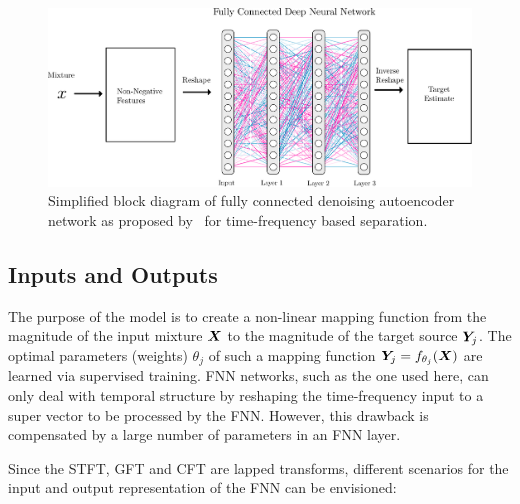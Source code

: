 \begin{figure}[ht!]
\centering
  \includegraphics[width=\textwidth]{Chapters/06_Separation_Unknown/figures/uhlich_dnn.pdf}
\caption{Simplified block diagram of fully connected denoising autoencoder network as proposed by~\cite{uhlich15} for time-frequency based separation.}
\label{fig:cft_dnn}
\end{figure}

\subsection{Inputs and Outputs}

The purpose of the model is to create a non-linear mapping function from the magnitude of the input mixture \({\bm{X}}\) to the magnitude of the target source \({\bm{Y}}_j\).
The optimal parameters (weights) \(\theta_j\) of such a mapping function \({\bm{Y}}_j = f_{\theta_j}({\bm{X}})\) are learned via supervised training.
\acs{FNN} networks, such as the one used here, can only deal with temporal structure by reshaping the time-frequency input to a super vector to be processed by the \acs{FNN}. 
However, this drawback is compensated by a large number of parameters in an \acs{FNN} layer.

Since the \acs{STFT}, GFT and CFT are lapped transforms, different scenarios for the input and output representation of the \acs{FNN} can be envisioned:

